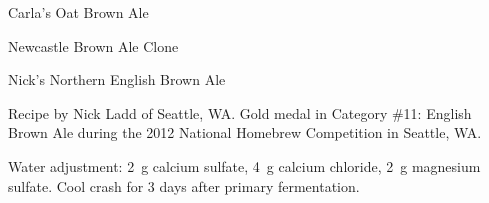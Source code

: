 \begin{recipe}{Carla's Oat Brown Ale}
\begin{recipe}{Newcastle Brown Ale Clone}
\begin{ingredientsblock}

\end{ingredientsblock}

\end{recipe}

\begin{recipe}{Nick's Northern English Brown Ale}

\begin{aboutblock}
Recipe by Nick Ladd of Seattle, WA. Gold medal in Category \#11: English Brown Ale
during the 2012 National Homebrew Competition in Seattle, WA. \sourceaha
\end{aboutblock}


\begin{methodandtiming}

\begin{mashsteps}
\end{mashsteps}

\begin{fermentationsteps}
\end{fermentationsteps}

\begin{directions}
Water adjustment: 2~g calcium sulfate, 4~g calcium chloride, 2~g magnesium sulfate.
Cool crash for 3 days after primary fermentation. 
\end{directions}

\end{methodandtiming}

\recipebreak

\begin{ingredientsblock}

\begin{malts}
\end{malts}

\begin{hops}
\end{hops}


\end{ingredientsblock}
\end{recipe}
\end{recipe}
